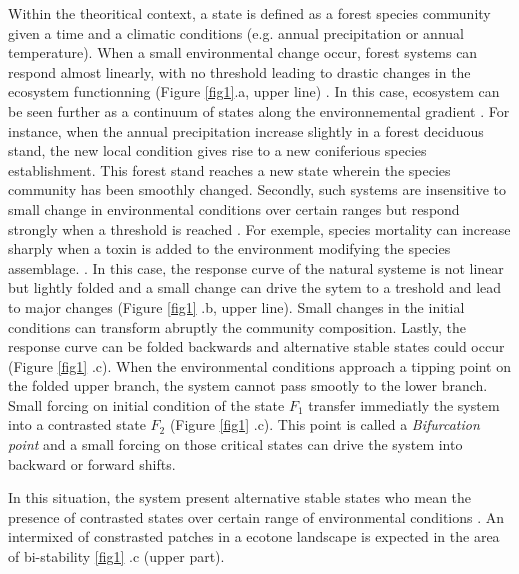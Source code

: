 Within the theoritical context, a state is defined as a forest species community
given a time and a climatic conditions (e.g. annual precipitation or annual
temperature). When a small environmental change occur, forest systems can
respond almost linearly, with no threshold leading to drastic changes in the
ecosystem functionning (Figure \ref{fig1}.a, upper line)
\cite{Scheffer2001,Scheffer2009}. In this case, ecosystem can be seen further
as a continuum of states along the environnemental gradient
\cite{Scheffer2001,Scheffer2009,scheffer2009critical}. For instance, when the
annual precipitation increase slightly in a forest deciduous stand, the new
local condition gives rise to a new coniferious species establishment. This
forest stand reaches a new state wherein the species community has been
smoothly changed. %
Secondly, such systems are insensitive to small change in
environmental conditions over certain ranges but respond strongly when a
threshold is reached \cite{scheffer2009critical}. For exemple, species
mortality can increase sharply when a toxin is added to the environment
modifying the species assemblage. \cite{scheffer2009critical}. In this case,
the response curve of the natural systeme is not linear but lightly folded and
a small change can drive the sytem to a treshold and lead to major changes
(Figure \ref{fig1} .b, upper line). Small changes in the initial conditions
can transform abruptly the community composition. Lastly, the response curve
can be folded backwards and alternative stable states could occur (Figure
\ref{fig1} .c). When the environmental conditions approach a tipping point on
the folded upper branch, the system cannot pass smootly to the lower branch.
Small forcing on initial condition of the state $F_1$ transfer immediatly the
system into a contrasted state $F_2$ (Figure \ref{fig1} .c). This point is
called a \textit{Bifurcation point} and a small forcing on those critical
states can drive the system into backward or forward shifts.


In this situation, the system present alternative stable states who mean the
presence of contrasted states over certain range of environmental conditions
\cite{scheffer2009critical}. An intermixed of constrasted patches in a ecotone
landscape is expected in the area of bi-stability \ref{fig1} .c (upper part).\\



